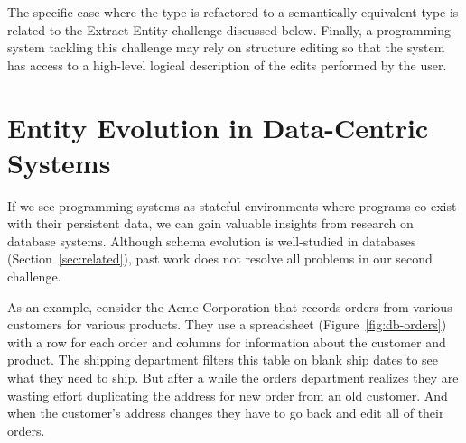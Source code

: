 \documentclass[english,submission]{programming}
\begin{document}
The specific case where the type is refactored to a semantically equivalent type is related to
the Extract Entity challenge discussed below. Finally, a programming system tackling this
challenge may rely on structure editing so that the system has access to a high-level logical
description of the edits performed by the user.


\section{Entity Evolution in Data-Centric Systems}
If we see programming systems as stateful environments where programs co-exist with their persistent
data, we can gain valuable insights from research on database systems.
Although schema evolution is well-studied in databases (Section~\ref{sec:related}), past work
does not resolve all problems in our second challenge.

As an example, consider the Acme Corporation that records orders from various customers for
various products. They use a spreadsheet (Figure~\ref{fig:db-orders}) with a row for each order
and columns for information about the customer and product. The shipping department filters this
table on blank ship dates to see what they need to ship. But after a while the orders department
realizes they are wasting effort duplicating the address for new order from an old customer. And
when the customer's address changes they have to go back and edit all of their orders.
\end{document}
